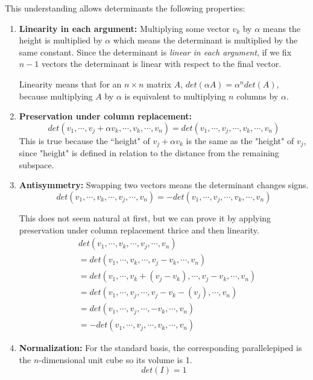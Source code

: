 This understanding allows determinants the following properties: 
\begin{enumerate}
	\item \textbf{Linearity in each argument: } Multiplying some vector $v_{k}$ by $\alpha$ means the height is multiplied by $\alpha$ which means the determinant is multiplied by the same constant. Since the determinant is \textit{linear in each argument}, if we fix $n-1$ vectors the determinant is linear with respect to the final vector. 
	
	Linearity means that for an $n \times n$ matrix $A$,  $det(\alpha A) = \alpha^{n} det(A)$, because multiplying $A$ by $\alpha$ is equivalent to multiplying $n$ columns by $\alpha$. 
	\item \textbf{Preservation under column replacement: } 
	$$det(v_{1}, \cdots, v_{j} + \alpha v_{k}, \cdots, v_{k}, \cdots, v_{n}) = det(v_{1}, \cdots, v_{j}, \cdots, v_{k}, \cdots, v_{n})$$
	This is true because the ``height" of $v_{j} + \alpha v_{k}$ is the same as the "height" of $v_{j}$, since "height" is defined in relation to the distance from the remaining subspace. 
	\item \textbf{Antisymmetry: } Swapping two vectors means the determinant changes signs. 
	$$det(v_{1}, \cdots, v_{k}, \cdots, v_{j}, \cdots, v_{n}) = -det(v_{1}, \cdots, v_{j}, \cdots, v_{k}, \cdots, v_{n})$$
	
This does not seem natural at first, but we can prove it by applying preservation under column replacement thrice and then linearity. 
$$ 
\begin{aligned}
&det(v_{1}, \cdots, v_{k}, \cdots, v_{j}, \cdots, v_{n}) \\ 
&= det(v_{1}, \cdots, v_{k}, \cdots, v_{j} - v_{k}, \cdots, v_{n}) \\
&= det(v_{1}, \cdots, v_{k} + (v_{j} - v_{k}), \cdots, v_{j} - v_{k}, \cdots, v_{n}) \\
&= det(v_{1}, \cdots, v_{j}, \cdots, v_{j} - v_{k} - (v_{j}), \cdots, v_{n}) \\
&= det(v_{1}, \cdots, v_{j}, \cdots, -v_{k}, \cdots, v_{n}) \\
&= -det(v_{1}, \cdots, v_{j}, \cdots, v_{k}, \cdots, v_{n}) 
\end{aligned}
$$

	\item \textbf{Normalization: } For the standard basis, the corresponding parallelepiped is the $n$-dimensional unit cube so its volume is 1. 
	$$det(I) = 1$$
\end{enumerate}


